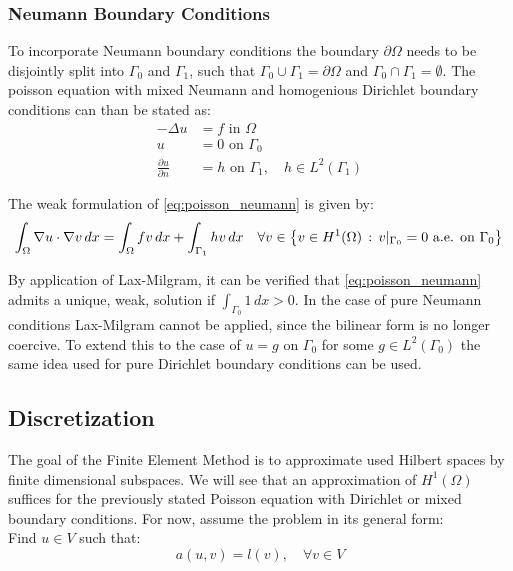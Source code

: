 \documentclass[11pt,a4paper]{article}
\begin{document}
\subsubsection*{Neumann Boundary Conditions}
To incorporate Neumann boundary conditions the boundary $\partial\Omega$ needs
to be disjointly split into $\Gamma_0$ and $\Gamma_1$, such that
$\Gamma_0 \cup \Gamma_1 = \partial\Omega$ and $\Gamma_0 \cap \Gamma_1 = \emptyset$.
The poisson equation with mixed Neumann and homogenious Dirichlet boundary
conditions can than be stated as:
\begin{equation} \label{eq:poisson_neumann}
  \begin{split}
    -\Delta u &= f  \text{ in } \Omega \\
    u &= 0 \text{ on } \Gamma_0 \\
    \frac{\partial u}{\partial n} &= h \text{ on } \Gamma_1, \quad h\in L^2(\Gamma_1)
  \end{split}
\end{equation}

The weak formulation of \ref{eq:poisson_neumann} is given by:
\begin{equation}
  \int_\Omega \nabla u \cdot \nabla v\,dx
  = \int_\Omega fv\,dx + \int_{\Gamma_1}hv\,dx \quad
  \forall v \in \left\{ v \in H^1(\Omega)\, :\, v\vert_{\Gamma_0} = 0 \text{ a.e. on } \Gamma_0\right\}\\
\end{equation}

By application of Lax-Milgram, it can be verified that \ref{eq:poisson_neumann}
admits a unique, weak, solution if $\int_{\Gamma_0}1\,dx > 0$.
In the case of pure Neumann conditions Lax-Milgram cannot be applied, since the
bilinear form is no longer coercive. To extend this to the case of $u = g$ on
$\Gamma_0$ for some $g \in L^2(\Gamma_0)$ the same idea used for pure Dirichlet
boundary conditions can be used.


\subsection*{Discretization}
The goal of the Finite Element Method is to approximate used Hilbert spaces by
finite dimensional subspaces. We will see that an approximation of $H^1(\Omega)$
suffices for the previously stated Poisson equation with Dirichlet or mixed
boundary conditions. For now, assume the problem in its general form:\\

Find $u \in V$ such that:
\begin{equation}
  a(u,v) = l(v), \quad \forall v \in V
\end{equation}
\end{document}
